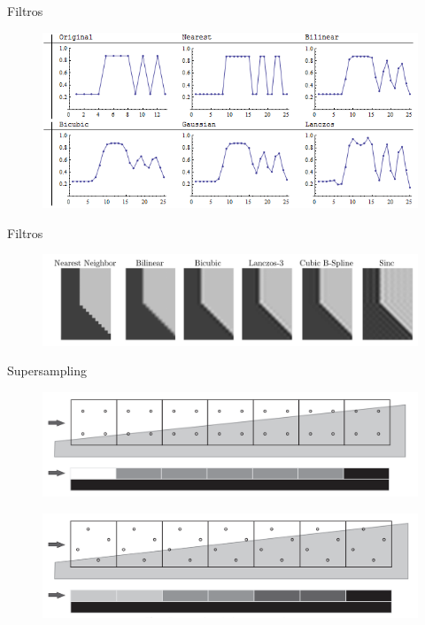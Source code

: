 \documentclass[table]{beamer}
\begin{document}
\begin{frame}[fragile]{Filtros}
    \begin{figure}
        \includegraphics[width=\linewidth]{./figures/Lw6ei.png}
    \end{figure}
\end{frame}

\begin{frame}[fragile]{Filtros}
    \begin{figure}
        \includegraphics[width=\linewidth]{./figures/comparison-filter.png}
    \end{figure}
\end{frame}

\begin{frame}[fragile]{Supersampling}
    \begin{figure}
        \includegraphics[width=\linewidth]{./figures/ogss.png}
    \end{figure}
    \begin{figure}
        \includegraphics[width=\linewidth]{./figures/rgss.png}
    \end{figure}
\end{frame}
\end{document}
